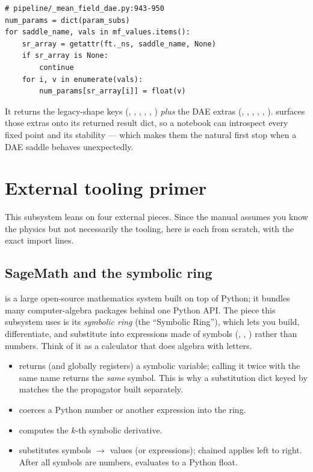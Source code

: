 \begin{lstlisting}
# pipeline/_mean_field_dae.py:943-950
num_params = dict(param_subs)
for saddle_name, vals in mf_values.items():
    sr_array = getattr(ft._ns, saddle_name, None)
    if sr_array is None:
        continue
    for i, v in enumerate(vals):
        num_params[sr_array[i]] = float(v)
\end{lstlisting}

It returns the legacy-shape keys (, ,
, , ,
) \emph{plus} the DAE extras (,
, , ,
, ). 
surfaces those extras onto its returned result dict, so a notebook can introspect
every fixed point and its stability --- which makes them the natural first stop
when a DAE saddle behaves unexpectedly.

\section{External tooling primer}\label{sec:mf-tools}

This subsystem leans on four external pieces. Since the manual assumes you know
the physics but not necessarily the tooling, here is each from scratch, with the
exact import lines.

\subsection{SageMath and the symbolic ring }

 is a large open-source mathematics system built on top of Python;
it bundles many computer-algebra packages behind one Python API. The piece this
subsystem uses is its \emph{symbolic ring}  (the ``Symbolic Ring''),
which lets you build, differentiate, and substitute into expressions made of
symbols (, , ) rather than numbers. Think of it as a
calculator that does algebra with letters.

\begin{itemize}
  \item {} returns (and globally registers) a symbolic
        variable; calling it twice with the same name returns the \emph{same}
        symbol. This is why a substitution dict keyed by 
        matches the  the propagator built separately.
  \item {} coerces a Python number or another expression into the
        ring.
  \item {} computes the $k$-th symbolic derivative.
  \item {} substitutes symbols $\to$ values (or expressions);
        chained  applies left to right. After all
        symbols are numbers,  evaluates to a Python float.
\end{itemize}

